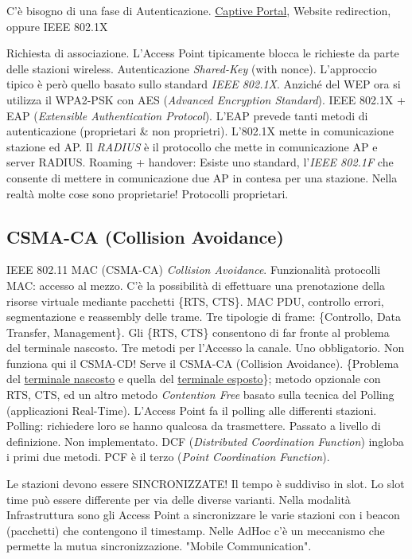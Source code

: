 C'è bisogno di una fase di Autenticazione. \underline{Captive Portal}, Website redirection, oppure IEEE 802.1X

Richiesta di associazione. L'Access Point tipicamente blocca le richieste da parte delle stazioni wireless. Autenticazione \textit{Shared-Key} (with nonce). L'approccio tipico è però quello basato sullo standard \textit{IEEE 802.1X}. Anziché del WEP ora si utilizza il WPA2-PSK con AES (\textit{Advanced Encryption Standard}). IEEE 802.1X + EAP (\textit{Extensible Authentication Protocol}). L'EAP prevede tanti metodi di autenticazione (proprietari \& non proprietri). L'802.1X mette in comunicazione stazione ed AP. Il \textit{RADIUS} è il protocollo che mette in comunicazione AP e server RADIUS. Roaming + handover: Esiste uno standard, l'\textit{IEEE 802.1F} che consente di mettere in comunicazione due AP in contesa per una stazione. Nella realtà molte cose sono proprietarie! Protocolli proprietari.

\subsection{CSMA-CA (Collision Avoidance)}

IEEE 802.11 MAC (CSMA-CA) \textit{Collision Avoidance}. Funzionalità protocolli MAC: accesso al mezzo. C'è la possibilità di effettuare una prenotazione della risorse virtuale mediante pacchetti \{RTS, CTS\}. MAC PDU, controllo errori, segmentazione e reassembly delle trame. Tre tipologie di frame: \{Controllo, Data Transfer, Management\}. Gli \{RTS, CTS\} consentono di far fronte al problema del terminale nascosto. Tre metodi per l'Accesso la canale. Uno obbligatorio. Non funziona qui il CSMA-CD! Serve il CSMA-CA (Collision Avoidance). \{Problema del \underline{terminale nascosto} e quella del \underline{terminale esposto}\}; metodo opzionale con RTS, CTS, ed un altro metodo \textit{Contention Free} basato sulla tecnica del Polling (applicazioni Real-Time). L'Access Point fa il polling alle differenti stazioni. Polling: richiedere loro se hanno qualcosa da trasmettere. Passato a livello di definizione. Non implementato. DCF (\textit{Distributed Coordination Function}) ingloba i primi due metodi. PCF è il terzo (\textit{Point Coordination Function}).

Le stazioni devono essere SINCRONIZZATE! Il tempo è suddiviso in slot. Lo slot time può essere differente per via delle diverse varianti. Nella modalità Infrastruttura sono gli Access Point a sincronizzare le varie stazioni con i beacon (pacchetti) che contengono il timestamp. Nelle AdHoc c'è un meccanismo che permette la mutua sincronizzazione. "Mobile Communication".

